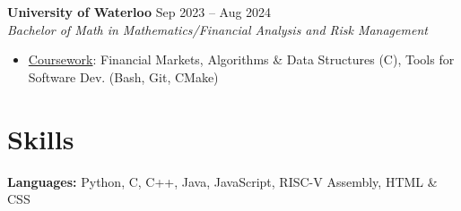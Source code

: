 \documentclass[10pt,letterpaper]{article}
\begin{document}

\raggedright
\textbf{University of Waterloo} \hfill
Sep 2023 -- Aug 2024 \\
\textit{Bachelor of Math in Mathematics/Financial Analysis and Risk Management} \hfill
\begin{itemize}
    \item \underline{Coursework}: 
    Financial Markets, 
    Algorithms \& Data Structures (C), 
    Tools for Software Dev. (Bash, Git, CMake)
\end{itemize}













\section{Skills}

\hspace{0.75em}\textbf{Languages:} 
    Python, C, C++, Java, JavaScript, RISC-V Assembly, HTML \& CSS \\
\end{document}

